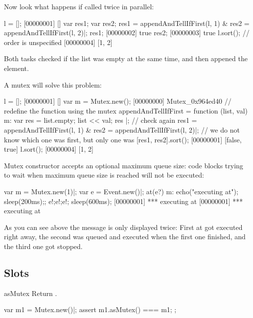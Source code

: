 Now look what happens if called twice in parallel:

\begin{urbiscript}
l = [];
[00000001] []
var res1; var res2;
res1 = appendAndTellIfFirst(l, 1) & res2 = appendAndTellIfFirst(l, 2)|;
res1;
[00000002] true
res2;
[00000003] true
l.sort(); // order is unspecified
[00000004] [1, 2]
\end{urbiscript}

Both tasks checked if the list was empty at the same time, and then appened the
element.

A mutex will solve this problem:

\begin{urbiscript}
l = [];
[00000001] []
var m = Mutex.new();
[00000000] Mutex_0x964ed40
// redefine the function using the mutex
appendAndTellIfFirst = function (list, val)
{m:{
  var res = list.empty;
  list << val;
  res
}}|;
// check again
res1 = appendAndTellIfFirst(l, 1) & res2 = appendAndTellIfFirst(l, 2)|;
// we do not know which one was first, but only one was
[res1, res2].sort();
[00000001] [false, true]
l.sort();
[00000004] [1, 2]
\end{urbiscript}

Mutex constructor accepts an optional maximum queue size: code blocks
trying to wait when maximum queue size is reached will not be executed:

\begin{urbiscript}[firstnumber=1]
var m = Mutex.new(1)|;
var e = Event.new()|;
at(e?)
  m: { echo("executing at"); sleep(200ms);};
e!;e!;e!;
sleep(600ms);
[00000001] *** executing at
[00000001] *** executing at
\end{urbiscript}

As you can see above the message is only displayed twice: First at got executed
right away, the second was queued and executed when the first one finished, and
the third one got stopped.

\subsection{Slots}

\begin{urbiscriptapi}
\item[asMutex]  Return \this.
\begin{urbiscript}
var m1 = Mutex.new()|;
assert
{
  m1.asMutex() === m1;
};
\end{urbiscript}
\end{urbiscriptapi}


